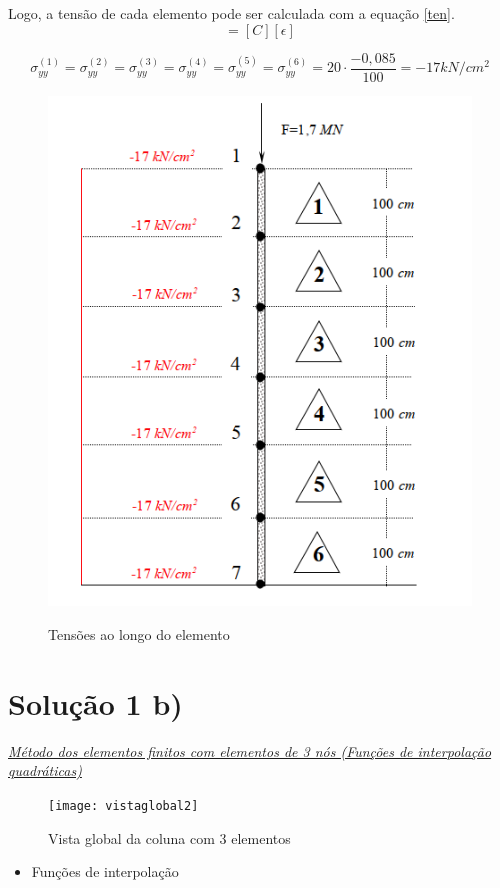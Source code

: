 \documentclass{article} %
\begin{document}
\indent Logo, a tensão de cada elemento pode ser calculada com a equação \ref{ten}.
\begin{equation*}
[\sigma]=[C][\epsilon]
\end{equation*}

\begin{equation}
\sigma_{yy}^{(1)}=\sigma_{yy}^{(2)}=\sigma_{yy}^{(3)}=\sigma_{yy}^{(4)}=\sigma_{yy}^{(5)}=\sigma_{yy}^{(6)}=20\cdot \frac{-0,085}{100}=-17 kN/cm^2
\end{equation}


\begin{figure}[H]
	\centering
	\caption{Tensões ao longo do elemento}
	\includegraphics[width=0.55\linewidth]{tensao}	
	\label{tensoes}	
\end{figure}
\newpage

\section*{Solução 1 b)}

\vspace{10mm}
\underline{\large \textit{Método dos elementos finitos com elementos de 3 nós (Funções de interpolação quadráticas)}}\\


\begin{figure}[H]
	\centering
	\caption{Vista global da coluna com 3 elementos}
	\texttt{[image: vistaglobal2]}	
	\label{patton}	
\end{figure}





\begin{itemize}
	\item Funções de interpolação	
\end{itemize}
\end{document}

